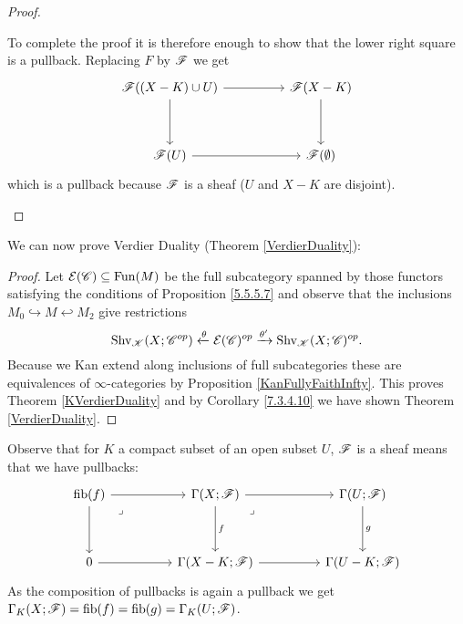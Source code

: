 \documentclass[../../thesis.tex]{subfiles}
\begin{document}
\begin{proof}
\begin{enumerate}[label=(\alph*)]
              To complete the proof it is therefore enough to show that the lower right square is a pullback.
              Replacing $F$ by $\mathscr{F}$ we get
              \[\begin{tikzcd}
                      {\F((X-K) \cup U)} && {\F(X-K)} \\
                      \\
                      {\F(U)} && {\F(\emptyset)}
                      \arrow[from=1-1, to=1-3]
                      \arrow[from=1-3, to=3-3]
                      \arrow[from=3-1, to=3-3]
                      \arrow[from=1-1, to=3-1]
                  \end{tikzcd}\]
              which is a pullback because $\mathscr{F}$ is a sheaf ($U$ and $X-K$ are disjoint).\qedhere
    \end{enumerate}
\end{proof}
We can now prove Verdier Duality (Theorem \ref{VerdierDuality}):
\begin{proof}
    Let $\mathcal{E}(\mathscr{C}) \subseteq \mathrm{Fun}(M)$ be the full subcategory spanned by those functors satisfying the conditions of Proposition \ref{5.5.5.7} and observe that the inclusions $M_0 \hookrightarrow M \hookleftarrow M_2$ give restrictions
    \[
        \mathrm{Shv}_{\mathscr{K}}(X;\mathscr{C}^{op}) \xleftarrow{\theta} \mathcal{E}(\mathscr{C})^{op} \xrightarrow{\theta'} \mathrm{Shv}_{\mathscr{K}}(X;\mathscr{C})^{op}.
    \]
    Because we Kan extend along inclusions of full subcategories these are equivalences of $\infty$-categories by Proposition \ref{KanFullyFaithInfty}.
    This proves Theorem \ref{KVerdierDuality} and by Corollary \ref{7.3.4.10} we have shown Theorem \ref{VerdierDuality}.
\end{proof}
\begin{remark}\label{GammaKXisGammaKU}
    Observe that for $K$ a compact subset of an open subset $U$, $\mathscr{F}$ is a sheaf means that we have pullbacks:
    \[\begin{tikzcd}
            {\fib(f)} && {\Gamma(X;\F)} && {\Gamma(U;\F)} \\
            \\
            0 && {\Gamma(X-K;\F)} && {\Gamma(U-K;\F)}
            \arrow[from=1-3, to=1-5]
            \arrow["f", from=1-3, to=3-3]
            \arrow[from=3-3, to=3-5]
            \arrow["g", from=1-5, to=3-5]
            \arrow["\lrcorner"{anchor=center, pos=0.125}, draw=none, from=1-3, to=3-5]
            \arrow[from=1-1, to=3-1]
            \arrow[from=3-1, to=3-3]
            \arrow[from=1-1, to=1-3]
            \arrow["\lrcorner"{anchor=center, pos=0.125}, draw=none, from=1-1, to=3-3]
        \end{tikzcd}\]
    As the composition of pullbacks is again a pullback we get $\Gamma_K(X;\mathscr{F})=\operatorname{fib}(f)=\operatorname{fib}(g)=\Gamma_K(U;\mathscr{F})$.
\end{remark}
\end{document}
